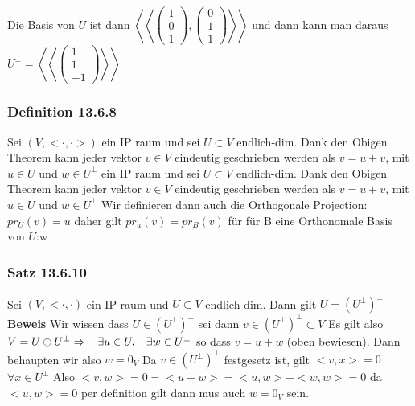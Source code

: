 \documentclass{article}
\newcommand{\smspc}{\hspace{0.3cm}}
\newcommand{\kk}[1]{\left<\left<{#1}\right>\right>}
\newcommand{\satz}[1]{\subsubsection*{Satz {#1}}}
\newcommand{\beweis}{\\\textbf{Beweis }}
\newcommand{\definition}[1]{\subsubsection*{Definition {#1}}}
\begin{document}
  Die Basis von $U$ ist dann $\kk{\begin{pmatrix}1\\0\\1\end{pmatrix},\begin{pmatrix}0\\1\\1\end{pmatrix}}$ und dann kann man daraus $U^\perp=\kk{\begin{pmatrix}1\\1\\-1\end{pmatrix}}$
  \definition{13.6.8} Sei $(V,<\cdot,\cdot>)$ ein IP raum und sei $U\subset V$ endlich-dim. Dank den Obigen Theorem kann jeder vektor $v\in V$ eindeutig geschrieben werden als $v=u+v$, mit $u\in U$ und $w\in U^\perp$ ein IP raum und sei $U\subset V$ endlich-dim. Dank den Obigen Theorem kann jeder vektor $v\in V$ eindeutig geschrieben werden als $v=u+v$, mit $u\in U$ und $w\in U^\perp$  
Wir definieren dann auch die Orthogonale Projection:$pr_U(v)=u$ daher gilt $pr_u(v)=pr_B(v)$ für für B eine Orthonomale Basis von $U$:w
\satz{13.6.10} Sei $(V,<\cdot,\cdot)$ ein IP raum und $U\subset V$ endlich-dim. Dann gilt $U=(U^\perp)^\perp$
\beweis Wir wissen dass $U\in(U^\perp)^\perp$ sei dann $v\in (U^\perp)^\perp\subset V$ Es gilt also $V=U\oplus U^\perp\Rightarrow\smspc \exists u \in U, \smspc \exists w\in U^\perp$ so dass $v=u+w$ (oben bewiesen). Dann behaupten wir also $w=0_V$
Da $v\in(U^\perp)^\perp$ festgesetz ist, gilt $<v,x>=0$ $\forall x\in U^\perp$ Also $<v,w>=0=<u+w>={<u,w>}+<w,w>=0$ da $<u,w>=0$ per definition gilt dann mus auch $w=0_V$ sein.
\end{document}
